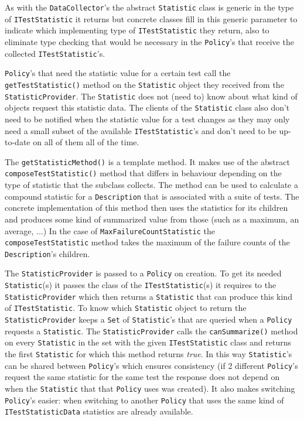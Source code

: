 \documentclass[i2]{oss}
\newcommand{\class}[1]{\texttt{#1}}
\newcommand{\method}[1]{\texttt{#1}}
\begin{document}
As with the \class{DataCollector}'s the abstract \class{Statistic} class
is generic in the type of \class{ITestStatistic} it returns but concrete
classes fill in this generic parameter to indicate which implementing
type of \class{ITestStatistic} they return, also to eliminate type 
checking that would be necessary in the \class{Policy}'s that receive
the collected \class{ITestStatistic}'s.

\class{Policy}'s that need the statistic value for a certain test call
the \method{getTestStatistic()} method on the \class{Statistic} object
they received from the \class{StatisticProvider}.
The \class{Statistic} does not (need to) know about what kind of objects
request this statistic data.
The clients of the \class{Statistic} class also don't need to be 
notified when the statistic value for a test changes as they may only
need a small subset of the available \class{ITestStatistic}'s and don't
need to be up-to-date on all of them all of the time.

The \method{getStatisticMethod()} is a template method.
It makes use of the abstract \method{composeTestStatistic()} method 
that differs in behaviour depending on the type of statistic that the
subclass collects.
The method can be used to calculate a compound statistic for a 
\class{Description} that is associated with a suite of tests.
The concrete implementation of this method then uses the statistics for
its children and produces some kind of summarized value from those (such
as a maximum, an average, ...)
In the case of \class{MaxFailureCountStatistic} the 
\method{composeTestStatistic} method takes the maximum of the failure
counts of the \class{Description}'s children.

The \class{StatisticProvider} is passed to a \class{Policy} on creation.
To get its needed \class{Statistic}(s) it passes the class of the 
\class{ITestStatistic}(s) it requires to the \class{StatisticProvider}
which then returns a \class{Statistic} that can produce this kind of
\class{ITestStatistic}.
To know which \class{Statistic} object to return the 
\class{StatisticProvider} keeps a \class{Set} of \class{Statistic}'s 
that are queried when a \class{Policy} requests a \class{Statistic}.
The \class{StatisticProvider} calls the \method{canSummarize()} method
on every \class{Statistic} in the set with the given 
\class{ITestStatistic} class and returns the first \class{Statistic}
for which this method returns \emph{true}.
In this way \class{Statistic}'s can be shared between \class{Policy}'s
which ensures consistency (if 2 different \class{Policy}'s request the
same statistic for the same test the response does not depend on when
the \class{Statistic} that that \class{Policy} uses was created).
It also makes switching \class{Policy}'s easier: when switching to 
another \class{Policy} that uses the same kind of 
\class{ITestStatisticData} statistics are already available.
\end{document}
